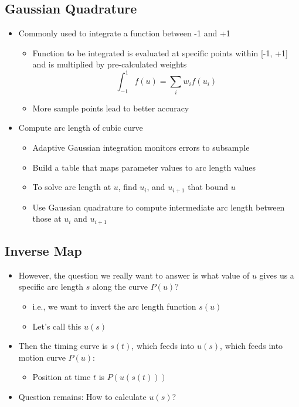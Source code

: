 \documentclass{article}
\begin{document}
\subsection*{Gaussian Quadrature}
\begin{itemize}
    \item Commonly used to integrate a function between -1 and +1
    \begin{itemize}
        \item Function to be integrated is evaluated at specific points within [-1, +1] and is multiplied by pre-calculated weights
        \[\int_{-1}^1 f(u) = \sum_i w_i f(u_i)\]
        \item More sample points lead to better accuracy
    \end{itemize}
    \item Compute arc length of cubic curve
    \begin{itemize}
        \item Adaptive Gaussian integration monitors errors to subsample
        \item Build a table that maps parameter values to arc length values
        \item To solve arc length at $u$, find $u_i$, and $u_{i + 1}$ that bound $u$
        \item Use Gaussian quadrature to compute intermediate arc length between those at $u_i$ and $u_{i + 1}$
    \end{itemize}
\end{itemize}

\subsection*{Inverse Map}
\begin{itemize}
    \item However, the question we really want to answer is what value of $u$ gives us a specific arc length $s$ along the curve $P(u)$?
    \begin{itemize}
        \item i.e., we want to invert the arc length function $s(u)$
        \item Let's call this $u(s)$
    \end{itemize}
    \item Then the timing curve is $s(t)$, which feeds into $u(s)$, which feeds into motion curve $P(u)$:
    \begin{itemize}
        \item Position at time $t$ is $P(u(s(t)))$
    \end{itemize}
    \item Question remains: How to calculate $u(s)$?
\end{itemize}
\end{document}
